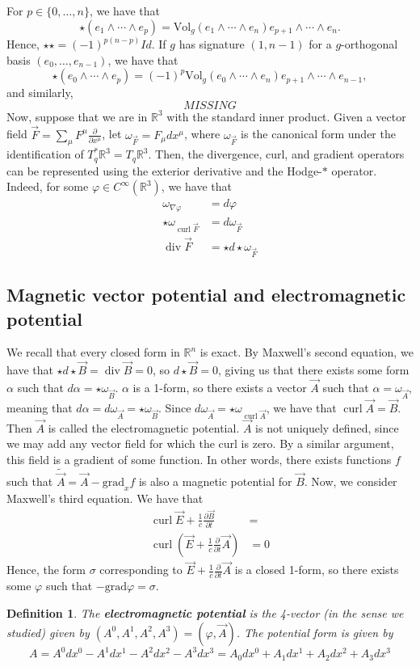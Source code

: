 \documentclass{article}
\newcommand{\R}{\mathbb R}
\newcommand{\nl}{\newline\newline\noindent}
\newcommand{\al}{\alpha}
\newcommand{\vhi}{\varphi}
\newcommand{\w}{\omega}
\newcommand{\pd}[1]{\frac{\partial}{\partial #1}}
\newcommand{\pdof}[2]{\frac{\partial #1}{\partial #2}}
\DeclareMathOperator{\Div}{div}
\DeclareMathOperator{\curl}{curl}
\newtheorem{defn}{Definition}
\begin{document}
For $p\in \{0,\dots, n\}$, we have that
\[\star(e_1\wedge \cdots \wedge e_p) = \text{Vol}_g(e_1\wedge \cdots \wedge e_n)e_{p+1}\wedge \cdots \wedge e_n.\]
Hence, $\star\star = (-1)^{p(n-p)}Id$. If $g$ has signature $(1,n-1)$ for a $g$-orthogonal basis $(e_0,\dots,e_{n-1})$, we have that
\[\star(e_0\wedge\cdots\wedge e_p) = (-1)^p\text{Vol}_g(e_0\wedge\cdots\wedge e_n)e_{p+1}\wedge \cdots \wedge e_{n-1},\]
and similarly,
\[MISSING\]
Now, suppose that we are in $\R^3$ with the standard inner product. Given a vector field $\vec F = \sum_\mu F^\mu\pd{x^\mu}$, let $\omega_{\vec F} = F_\mu dx^\mu$, where $\w_{\vec F}$ is the canonical form under the identification of $T_q^*\R^3 = T_q\R^3$. Then, the divergence, curl, and gradient operators can be represented using the exterior derivative and the Hodge-$*$ operator. Indeed, for some $\vhi\in C^\infty(\R^3)$, we have that
\begin{align*}
    \w_{\nabla\vhi} &= d\vhi\\
    \star\w_{\curl\vec F} &= d\w_{\vec F}\\
    \Div\vec F &= \star d\star\w_{\vec F}
\end{align*}
\subsection{Magnetic vector potential and electromagnetic potential}
We recall that every closed form in $\R^n$ is exact. By Maxwell's second equation, we have that $\star d\star\vec B = \Div\vec B = 0$, so $d\star\vec B = 0$, giving us that there exists some form $\al$ such that $d\al = \star\w_{\vec B}$. $\al$ is a 1-form, so there exists a vector $\vec A$ such that $\al = \w_{\vec A}$, meaning that
$d\al = d\w_{\vec A} = \star\w_{\vec B}$. Since $d\w_{\vec A} = \star \w_{\curl\vec A}$, we have that $\curl\vec A = \vec B$.
\nl
Then $\vec A$ is called the electromagnetic potential. $\vec A$ is not uniquely defined, since we may add any vector field for which the curl is zero. By a similar argument, this field is a gradient of some function. In other words, there exists functions $f$ such that $\tilde{\vec A} = \vec A - \text{grad}_xf$ is also a magnetic potential for $\vec B$.
\nl
Now, we consider Maxwell's third equation. We have that
\begin{align*}
    \curl \vec E + \frac{1}{c}\pdof{\vec B}{t} &=\\
    \curl \left(\vec E + \frac{1}{c}\pd{t} \vec A\right) &=0
\end{align*}
Hence, the form $\sigma$ corresponding to $\vec E + \frac{1}{c}\pd{t} \vec A$ is a closed 1-form, so there exists some $\vhi$ such that $-\text{grad}\vhi = \sigma$.
\begin{defn}
    The \textbf{electromagnetic potential} is the 4-vector (in the sense we studied) given by $(A^0,A^1,A^2,A^3) = (\vhi,\vec A)$. The potential form is given by
    \[A = A^0dx^0 - A^1dx^1 - A^2 dx^2 - A^3 dx^3 = A_0dx^0 + A_1dx^1 + A_2 dx^2 + A_3 dx^3\]
\end{defn}
\end{document}
